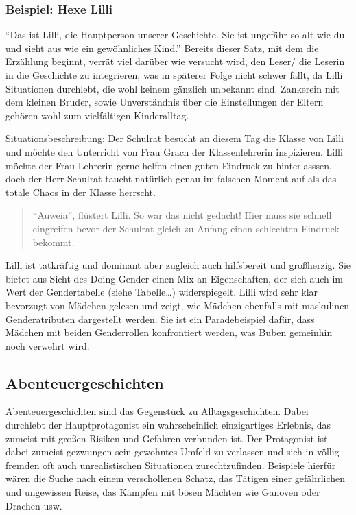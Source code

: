 \subsubsection{Beispiel: Hexe Lilli}

``Das ist Lilli, die Hauptperson unserer Geschichte. Sie ist ungefähr so
alt wie du und sieht aus wie ein gewöhnliches Kind.''
\parencite[][6]{KNISTER1999} Bereits dieser Satz, mit dem die Erzählung
beginnt, verrät viel darüber wie versucht wird, den Leser/ die Leserin
in die Geschichte zu integrieren, was in späterer Folge nicht schwer
fällt, da Lilli Situationen durchlebt, die wohl keinem gänzlich
unbekannt sind. Zankerein mit dem kleinen Bruder, sowie Unverständnis
über die Einstellungen der Eltern gehören wohl zum vielfältigen
Kinderalltag.

Situationsbeschreibung: Der Schulrat besucht an diesem Tag die Klasse
von Lilli und möchte den Unterricht von Frau Grach der Klassenlehrerin
inspizieren. Lilli möchte der Frau Lehrerin gerne helfen einen guten
Eindruck zu hinterlasssen, doch der Herr Schulrat taucht natürlich genau
im falschen Moment auf als das totale Chaos in der Klasse herrscht.

\begin{quote}
``Auweia'', flüstert Lilli. So war das nicht gedacht! Hier muss sie
schnell eingreifen bevor der Schulrat gleich zu Anfang einen schlechten
Eindruck bekommt. \parencite[][47
]{KNISTER1999}
\end{quote}

Lilli ist tatkräftig und dominant aber zugleich auch hilfsbereit und
großherzig. Sie bietet aus Sicht des Doing-Gender einen Mix an
Eigenschaften, der sich auch im Wert der Gendertabelle (siehe
Tabelle\ldots{}) widerspiegelt. Lilli wird sehr klar bevorzugt von
Mädchen gelesen und zeigt, wie Mädchen ebenfalls mit maskulinen
Genderatributen dargestellt werden. Sie ist ein Paradebeispiel dafür,
dass Mädchen mit beiden Genderrollen konfrontiert werden, was Buben
gemeinhin noch verwehrt wird.

\subsection{Abenteuergeschichten}

Abenteuergeschichten sind das Gegenstück zu Alltagsgeschichten. Dabei
durchlebt der Hauptprotagonist ein wahrscheinlich einzigartiges
Erlebnis, das zumeist mit großen Risiken und Gefahren verbunden ist. Der
Protagonist ist dabei zumeist gezwungen sein gewohntes Umfeld zu
verlassen und sich in völlig fremden oft auch unrealistischen
Situationen zurechtzufinden. Beispiele hierfür wären die Suche nach
einem verschollenen Schatz, das Tätigen einer gefährlichen und
ungewissen Reise, das Kämpfen mit bösen Mächten wie Ganoven oder Drachen
usw.

